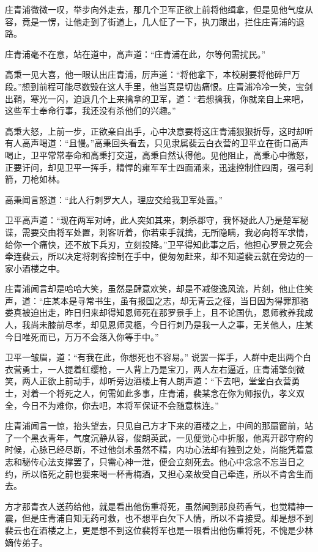 庄青浦微微一叹，举步向外走去，那几个卫军正欲上前将他缉拿，但是见他气度从容，竟是一愣，让他走到了街道上，几人怔了一下，执刀跟出，拦住庄青浦的退路。

庄青浦毫不在意，站在道中，高声道：“庄青浦在此，尔等何需扰民。”

高秉一见大喜，他一眼认出庄青浦，厉声道：“将他拿下，本校尉要将他碎尸万段。”想到前程可能尽数毁在这人手里，他当真是切齿痛恨。庄青浦冷冷一笑，宝剑出鞘，寒光一闪，迫退几个上来擒拿的卫军，道：“若想擒我，你就亲自上来吧，这些军士奉命行事，我还没有杀他们的兴趣。”

高秉大怒，上前一步，正欲亲自出手，心中决意要将这庄青浦狠狠折辱，这时却听有人高声喝道：“且慢。”高秉回头看去，只见隶属裴云白衣营的卫平立在街口高声喝止，卫平常常奉命和高秉打交道，高秉自然认得他。见他阻止，高秉心中微怒，正要讦问，却见卫平一挥手，精悍的雍军军士四面涌来，迅速控制住四周，强弓利箭，刀枪如林。

高秉闻言怒道：“此人行刺罗大人，理应交给我卫军处置。”

卫平高声道：“现在两军对峙，此人突如其来，刺杀郡守，我怀疑此人乃是楚军秘谍，需要交由将军处置，刺客听着，你若束手就擒，无所隐瞒，我必向将军求情，给你一个痛快，还不放下兵刃，立刻投降。”卫平得知此事之后，他担心罗景之死会牵连裴云，所以决定将刺客控制在手中，便匆匆赶来，却不知道裴云就在旁边的一家小酒楼之中。

庄青浦闻言却是哈哈大笑，虽然是肆意欢笑，却是不减俊逸风流，片刻，他止住笑声，道：“庄某本是寻常书生，虽有报国之志，却无青云之径，当日因为得罪那骆娄真被迫出走，昨日归来却得知恩师死在那罗景手上，且不论国仇，恩师教养我成人，我尚未膝前尽孝，却见恩师灵柩，今日行刺乃是我一人之事，无关他人，庄某今日唯死而已，万万不会落入你等手中。”

卫平一皱眉，道：“有我在此，你想死也不容易。” 说罢一挥手，人群中走出两个白衣营勇士，一人提着红缨枪，一人背上乃是宝刀，两人左右逼近，庄青浦擎剑微笑，两人正欲上前动手，却听旁边酒楼上有人朗声道：“下去吧，堂堂白衣营勇士，对着一个将死之人，何需如此多事，庄青浦，裴某念在你为师报仇，孝义双全，今日不为难你，你去吧，本将军保证不会随意株连。”

庄青浦闻言一惊，抬头望去，只见自己方才下来的酒楼之上，中间的那扇窗前，站了一个黑衣青年，气度沉静从容，俊朗英武，一见便觉心中折服，他离开郡守府的时候，心脉已经尽断，不过他剑术虽然不精，内功心法却有独到之处，尚能凭着意志和秘传心法支撑罢了，只需心神一泄，便会立刻死去。他心中念念不忘当日之约，所以临死之前也要来喝一杯青梅酒，又担心亲故受自己牵连，所以不肯舍生而去。

方才那青衣人送药给他，就是看出他伤重将死，虽然闻到那良药香气，也觉精神一震，但是庄青浦自知无药可救，也不想平白欠下人情，所以不肯接受。却是想不到裴云也在酒楼之上，更是想不到这位裴将军也是一眼看出他伤重将死，不愧是少林嫡传弟子。

